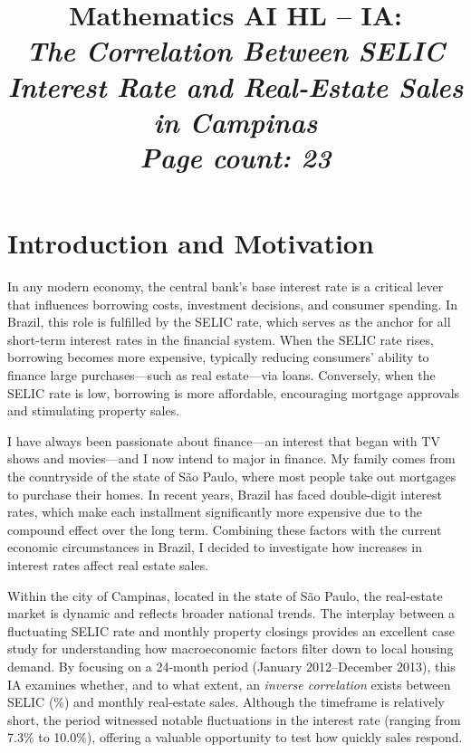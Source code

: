 \documentclass{article}
\title{\textbf{Mathematics AI HL -- IA:}\\[6pt]
\large{\textit{The Correlation Between SELIC Interest Rate and Real-Estate Sales in Campinas}\\

\textit{Page count: 23}}}
\subtitle
\begin{document}
\date{}
\maketitle
\clearpage


\section{Introduction and Motivation}
\label{sec:intro}



In any modern economy, the central bank’s base interest rate is a critical lever that influences borrowing costs, investment decisions, and consumer spending. In Brazil, this role is fulfilled by the SELIC rate, which serves as the anchor for all short-term interest rates in the financial system. When the SELIC rate rises, borrowing becomes more expensive, typically reducing consumers’ ability to finance large purchases—such as real estate—via loans. Conversely, when the SELIC rate is low, borrowing is more affordable, encouraging mortgage approvals and stimulating property sales.

I have always been passionate about finance—an interest that began with TV shows and movies—and I now intend to major in finance. My family comes from the countryside of the state of São Paulo, where most people take out mortgages to purchase their homes. In recent years, Brazil has faced double-digit interest rates, which make each installment significantly more expensive due to the compound effect over the long term. Combining these factors with the current economic circumstances in Brazil, I decided to investigate how increases in interest rates affect real estate sales.

Within the city of Campinas, located in the state of São Paulo, the real-estate market is dynamic and reflects broader national trends. The interplay between a fluctuating SELIC rate and monthly property closings provides an excellent case study for understanding how macroeconomic factors filter down to local housing demand. By focusing on a 24-month period (January 2012–December 2013), this IA examines whether, and to what extent, an \emph{inverse correlation} exists between SELIC (\%) and monthly real-estate sales. Although the timeframe is relatively short, the period witnessed notable fluctuations in the interest rate (ranging from 7.3\% to 10.0\%), offering a valuable opportunity to test how quickly sales respond.
\end{document}
